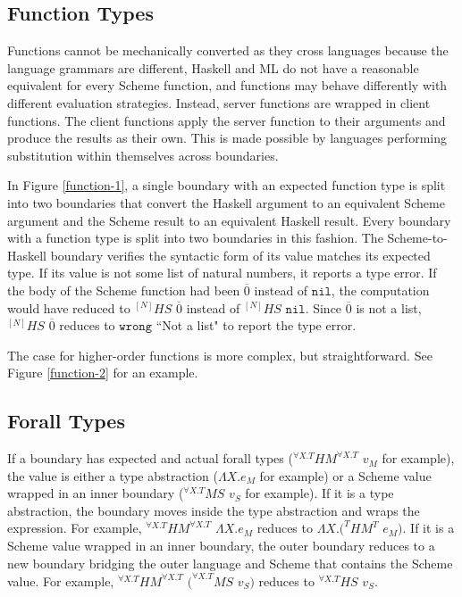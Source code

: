 \subsection{Function Types}

Functions cannot be mechanically converted as they cross languages because the language grammars are different, Haskell and ML do not have a reasonable equivalent for every Scheme function, and functions may behave differently with different evaluation strategies.  Instead, server functions are wrapped in client functions.  The client functions apply the server function to their arguments and produce the results as their own.  This is made possible by languages performing substitution within themselves across boundaries.

In Figure \ref{function-1}, a single boundary with an expected function type is split into two boundaries that convert the Haskell argument to an equivalent Scheme argument and the Scheme result to an equivalent Haskell result.  Every boundary with a function type is split into two boundaries in this fashion.  The Scheme-to-Haskell boundary verifies the syntactic form of its value matches its expected type.  If its value is not some list of natural numbers, it reports a type error.  If the body of the Scheme function had been $\overline{0}$ instead of $\mathtt{nil}$, the computation would have reduced to $^{[N]}HS$ $\overline{0}$ instead of $^{[N]}HS$ $\mathtt{nil}$.  Since $\overline{0}$ is not a list, $^{[N]}HS$ $\overline{0}$ reduces to $\mathtt{wrong}$ ``Not a list" to report the type error.



The case for higher-order functions is more complex, but straightforward.  See Figure \ref{function-2} for an example.



\subsection{Forall Types}

If a boundary has expected and actual forall types ($^{\forall X.T}HM^{\forall X.T}$ $v_{M}$ for example), the value is either a type abstraction ($\Lambda X.e_{M}$ for example) or a Scheme value wrapped in an inner boundary ($^{\forall X.T}MS$ $v_{S}$ for example).  If it is a type abstraction, the boundary moves inside the type abstraction and wraps the expression.  For example, $^{\forall X.T}HM^{\forall X.T}$ $\Lambda X.e_{M}$ reduces to $\Lambda X.(^{T}HM^{T}$ $e_{M})$.  If it is a Scheme value wrapped in an inner boundary, the outer boundary reduces to a new boundary bridging the outer language and Scheme that contains the Scheme value.  For example, $^{\forall X.T}HM^{\forall X.T}$ $(^{\forall X.T}MS$ $v_{S})$ reduces to $^{\forall X.T}HS$ $v_{S}$.

